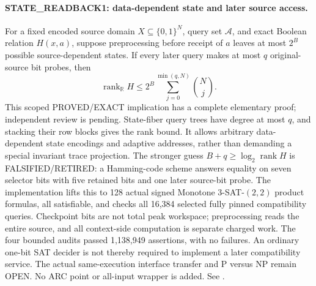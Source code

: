 \paragraph{STATE\_READBACK1: data-dependent state and later source access.}
For a fixed encoded source domain $X\subseteq\{0,1\}^N$, query set
$\mathcal A$, and exact Boolean relation $H(x,a)$, suppose preprocessing
before receipt of $a$ leaves at most $2^B$ possible source-dependent states.
If every later query makes at most $q$ original-source bit probes, then
\[
 \operatorname{rank}_{\mathbb R}H
 \le 2^B\sum_{j=0}^{\min(q,N)}\binom Nj.
\]
This scoped PROVED/EXACT implication has a complete elementary proof;
independent review is pending. State-fiber query trees have degree at most
$q$, and stacking their row blocks gives the rank bound. It allows arbitrary
data-dependent state encodings and adaptive addresses, rather than demanding
a special invariant trace projection.
The stronger guess $B+q\ge\log_2\operatorname{rank}H$ is FALSIFIED/RETIRED:
a Hamming-code scheme answers equality on seven selector bits with five
retained bits and one later source-bit probe. The implementation lifts this
to 128 actual signed Monotone 3-SAT-$(2,2)$ product formulas, all satisfiable,
and checks all 16,384 selected fully pinned compatibility queries.
Checkpoint bits are not total peak workspace; preprocessing reads the entire
source, and all context-side computation is separate charged work.
The four bounded audits passed 1,138,949 assertions, with no failures.
An ordinary one-bit SAT decider is not thereby required to implement a later
compatibility service. The actual same-execution interface transfer and
P versus NP remain OPEN. No ARC point or all-input wrapper is added.
See .
